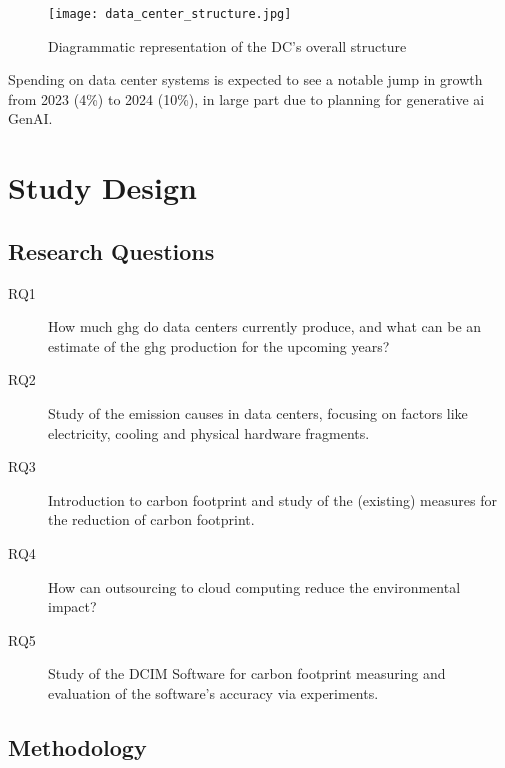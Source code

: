 \documentclass[
  a4paper,  %
  twoside,  %
  bibliography=totoc,
  headsepline,
  cleardoublepage=empty,
  parskip=half,
  draft=false
]{scrbook}
\begin{document}
\begin{figure}
	\centering
	\texttt{[image: data\_center\_structure.jpg]}
	\caption{Diagrammatic representation of the DC's overall structure\cite{ZHU2023104322}}
	\label{dc_structure}
\end{figure}

Spending on data center systems is expected to see a notable jump in growth from 2023 (4\%) to 2024 (10\%), in large part due to planning for generative \gls{ai} GenAI\cite{Gartner2024}.


\chapter{Study Design}
\section{Research Questions}

\begin{description}
	\item[RQ1] How much \gls{ghg} do data centers currently produce, and what can be an estimate of the \gls{ghg} production for the upcoming years?
	\item[RQ2] Study of the emission causes in data centers, focusing on factors like electricity, cooling and physical hardware fragments.
	\item[RQ3] Introduction to carbon footprint and study of the (existing) measures for the reduction of carbon footprint. 
	\item[RQ4] How can outsourcing to cloud computing reduce the environmental impact?
	\item[RQ5] Study of the DCIM Software for carbon footprint measuring and evaluation of the software's accuracy via experiments.
\end{description}

\section{Methodology}
\end{document}
